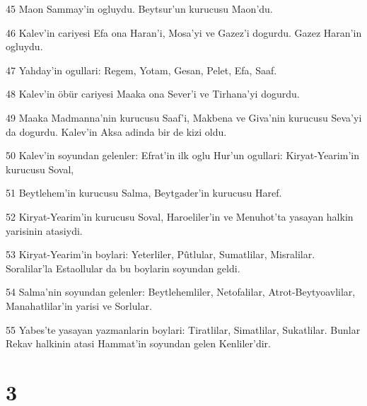\par 45 Maon Sammay'in ogluydu. Beytsur'un kurucusu Maon'du.
\par 46 Kalev'in cariyesi Efa ona Haran'i, Mosa'yi ve Gazez'i dogurdu. Gazez Haran'in ogluydu.
\par 47 Yahday'in ogullari: Regem, Yotam, Gesan, Pelet, Efa, Saaf.
\par 48 Kalev'in öbür cariyesi Maaka ona Sever'i ve Tirhana'yi dogurdu.
\par 49 Maaka Madmanna'nin kurucusu Saaf'i, Makbena ve Giva'nin kurucusu Seva'yi da dogurdu. Kalev'in Aksa adinda bir de kizi oldu.
\par 50 Kalev'in soyundan gelenler: Efrat'in ilk oglu Hur'un ogullari: Kiryat-Yearim'in kurucusu Soval,
\par 51 Beytlehem'in kurucusu Salma, Beytgader'in kurucusu Haref.
\par 52 Kiryat-Yearim'in kurucusu Soval, Haroeliler'in ve Menuhot'ta yasayan halkin yarisinin atasiydi.
\par 53 Kiryat-Yearim'in boylari: Yeterliler, Pûtlular, Sumatlilar, Misralilar. Soralilar'la Estaollular da bu boylarin soyundan geldi.
\par 54 Salma'nin soyundan gelenler: Beytlehemliler, Netofalilar, Atrot-Beytyoavlilar, Manahatlilar'in yarisi ve Sorlular.
\par 55 Yabes'te yasayan yazmanlarin boylari: Tiratlilar, Simatlilar, Sukatlilar. Bunlar Rekav halkinin atasi Hammat'in soyundan gelen Kenliler'dir.

\chapter{3}

